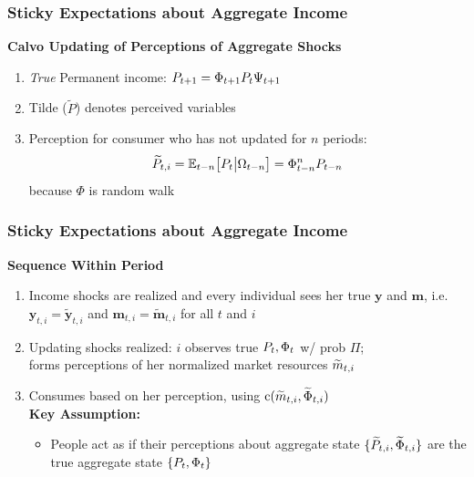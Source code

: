 \documentclass[10pt,english,t,10pt]{beamer}
\newcommand{\jemph}[1]{{\color{StataDarkBlue}#1}}
\newcommand{\jbemph}[1]{\textbf{\color{SlideNavy}#1}}
\providecommand{\perc}[1]{\widetilde{#1}}
\providecommand{\jemph}[1]{{\color{jirkasblue}#1}}
\begin{document}
\begin{frame}
\frametitle{Sticky Expectations about Aggregate Income}

\jbemph{\large Calvo Updating of Perceptions of Aggregate Shocks}\\
\begin{enumerate}
\item {\it True} Permanent income: ${P}_{t+1} =  \Phi_{t+1} {P}_{t}\Psi_{t+1}$\\
\item Tilde ($\perc{P}$) denotes perceived variables
\item \jemph{Perception for consumer who has not updated for $n$ periods:}
$$
  \perc{P}_{t,i}=\Ex_{t-n}\big[P_t\big\vert\Omega_{t-n}\big]=\Phi_{t-n}^nP_{t-n}
$$
because $\Phi$ is random walk 
\end{enumerate}
\end{frame}



\begin{frame}
\frametitle{Sticky Expectations about Aggregate Income}

\jbemph{\large Sequence Within Period}\\
\begin{enumerate}
\setlength{\itemsep}{2mm}
\item Income shocks are realized and every individual sees her true $\mathbf{y}$ and $\mathbf{m}$,
i.e.\ $\mathbf{y}_{t,i}=\perc{\mathbf{y}}_{t,i}$ and $\mathbf{m}_{t,i}=\perc{\mathbf{m}}_{t,i}$ for all $t$ and $i$

\item Updating shocks realized: $i$ observes true $P_t, \Phi_t$ w/ prob $\Pi$;\\
forms perceptions of her normalized market resources $\perc{\mLev}_{t,i}$

\pause
\item Consumes based on her perception, \jemph{using $\cFunc(\perc{m}_{t,i},\perc{\PtyGro}_{t,i})$}\\[1mm]
\vfill \vfill 
  \jemph{\textbf{Key Assumption:}}\\
    \begin{itemize}
    \item  People act as if their perceptions about aggregate state $\{\perc{P}_{t,i},\perc{\PtyGro}_{t,i}\}$
are the true aggregate state $\{P_t,\Phi_t\}$
    \end{itemize}

\end{enumerate}

\end{frame}
\end{document}
